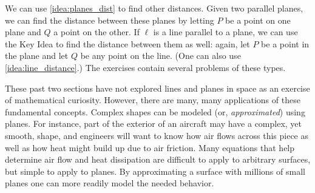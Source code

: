 We can use \autoref{idea:planes_dist} to find other distances. Given two parallel planes, we can find the distance between these planes by letting $P$ be a point on one plane and $Q$ a point on the other. If $\ell$ is a line parallel to a plane, we can use the Key Idea to find the distance between them as well: again, let $P$ be a point in the plane and let $Q$ be any point on the line. (One can also use \autoref{idea:line_distance}.) The exercises contain several problems of these types.

These past two sections have not explored lines and planes in space as an exercise of mathematical curiosity. However, there are many, many applications of these fundamental concepts. Complex shapes can be modeled (or, \emph{approximated}) using planes. For instance, part of the exterior of an aircraft may have a complex, yet smooth, shape, and engineers will want to know how air flows across this piece as well as how heat might build up due to air friction. Many equations that help determine air flow and heat dissipation are difficult to apply to arbitrary surfaces, but simple to apply to planes. By approximating a surface with millions of small planes one can more readily model the needed behavior.

